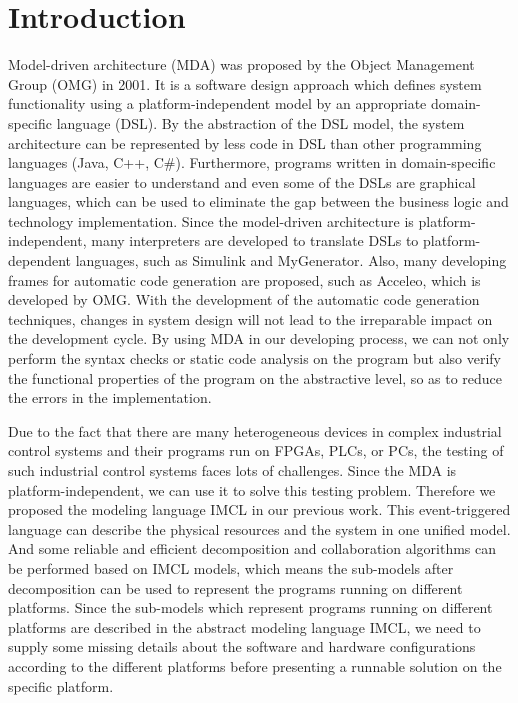 \section{Introduction}
Model-driven architecture (MDA) was proposed by the Object Management Group (OMG) in 2001\cite{mellor2002model}. It is a software design approach which defines system functionality using a platform-independent model by an appropriate domain-specific language (DSL). By the abstraction of the DSL model, the system architecture can be represented by less code in DSL than other programming languages (Java, C++, C\#). Furthermore, programs written in domain-specific languages are easier to understand and even some of the DSLs are graphical languages, which can be used to eliminate the gap between the business logic and technology implementation. Since the model-driven architecture is platform-independent, many interpreters are developed to translate DSLs to platform-dependent languages, such as Simulink and MyGenerator. Also, many developing frames for automatic code generation are proposed, such as Acceleo, which is developed by OMG. With the development of the automatic code generation techniques, changes in system design will not lead to the irreparable impact on the development cycle. By using MDA in our developing process, we can not only perform the syntax checks or static code analysis on the program but also verify the functional properties of the program on the abstractive level, so as to reduce the errors in the implementation.

Due to the fact that there are many heterogeneous devices in complex industrial control systems and their programs run on FPGAs\cite{monmasson2007fpga}, PLCs\cite{abdallah2004two}, or PCs, the testing of such industrial control systems faces lots of challenges. Since the MDA is platform-independent, we can use it to solve this testing problem. Therefore we proposed the modeling language IMCL in our previous work\cite{li2017decomposition}. This event-triggered language can describe the physical resources and the system in one unified model. And some reliable and efficient decomposition and collaboration algorithms can be performed based on IMCL models, which means the sub-models after decomposition can be used to represent the programs running on different platforms. Since the sub-models which represent programs running on different platforms are described in the abstract modeling language IMCL, we need to supply some missing details about the software and hardware configurations according to the different platforms before presenting a runnable solution on the specific platform.

